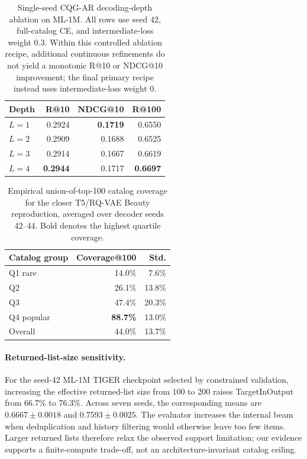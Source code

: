 \documentclass[letterpaper]{article}
\begin{document}
\begin{table}[!t]
\centering
\small
\setlength{\tabcolsep}{6pt}
\renewcommand{\arraystretch}{1.00}
\begin{tabular}{lrrr}
\toprule
Depth & R@10 & NDCG@10 & R@100 \\
\midrule
\(L=1\) & 0.2924 & \textbf{0.1719} & 0.6550 \\
\(L=2\) & 0.2909 & 0.1688 & 0.6525 \\
\(L=3\) & 0.2914 & 0.1667 & 0.6619 \\
\(L=4\) & \textbf{0.2944} & 0.1717 & \textbf{0.6697} \\
\bottomrule
\end{tabular}
\caption{Single-seed CQG-AR decoding-depth ablation on ML-1M. All rows use
seed 42, full-catalog CE, and intermediate-loss weight 0.3. Within this
controlled ablation recipe, additional continuous refinements do not yield a
monotonic R@10 or NDCG@10 improvement; the final primary recipe instead uses
intermediate-loss weight 0.}
\label{tab:ar-depth}
\end{table}


\begin{table}[!htbp]
\centering
\small
\begin{tabular}{lrr}
\toprule
Catalog group & Coverage@100 & Std. \\
\midrule
Q1 rare & 14.0\% & 7.6\% \\
Q2 & 26.1\% & 13.8\% \\
Q3 & 47.4\% & 20.3\% \\
Q4 popular & \textbf{88.7\%} & 13.0\% \\
\midrule
Overall & 44.0\% & 13.7\% \\
\bottomrule
\end{tabular}
\caption{Empirical union-of-top-100 catalog coverage for the closer T5/RQ-VAE
Beauty reproduction, averaged over decoder seeds 42--44. Bold denotes the
highest quartile coverage.}
\label{tab:faithful-coverage}
\end{table}

\paragraph{Returned-list-size sensitivity.}
For the seed-42 ML-1M TIGER checkpoint selected by constrained validation,
increasing the effective returned-list size from 100 to 200 raises
TargetInOutput from 66.7\% to 76.3\%. Across seven seeds, the corresponding
means are \(0.6667\pm0.0018\) and \(0.7593\pm0.0025\). The evaluator increases
the internal beam when deduplication and history filtering would otherwise
leave too few items. Larger returned lists therefore relax the observed
support limitation; our evidence supports a finite-compute trade-off, not an
architecture-invariant catalog ceiling.
\end{document}
